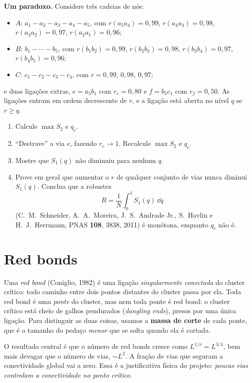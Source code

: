 \documentclass[11pt]{article}
\begin{document}
 \textbf{Um paradoxo.} Considere três cadeias de nós:
\begin{itemize}
  \item $A$: $a_1-a_2-a_3-a_4-a_5$, com $r(a_5a_4)=0{,}99$, $r(a_4a_3)=0{,}98$, $r(a_3a_2)=0{,}97$, $r(a_2a_1)=0{,}96$;
  \item $B$: $b_1-\cdots-b_5$, com $r(b_1b_2)=0{,}99$, $r(b_2b_3)=0{,}98$, $r(b_3b_4)=0{,}97$, $r(b_4b_5)=0{,}96$;
  \item $C$: $c_1-c_2-c_3-c_4$, com $r = 0{,}99$, $0{,}98$, $0{,}97$;
\end{itemize}
e duas ligações extras, $e = a_5b_1$ com $r_e = 0{,}80$ e $f = b_5c_1$ com $r_f = 0{,}50$. As ligações entram em ordem decrescente de $r$, e a ligação está aberta no nível $q$ se $r\ge q$.
\begin{enumerate}
  \item Calcule $\max S_2$ e $q_c$.
  \item ``Destrave'' a via $e$, fazendo $r_e\to 1$. Recalcule $\max S_2$ e $q_c$.
  \item Mostre que $S_1(q)$ não diminuiu para nenhum $q$.
  \item Prove em geral que aumentar o $r$ de qualquer conjunto de vias nunca diminui $S_1(q)$. Conclua que a robustez
  \[ R = \frac1N\int_0^1 S_1(q)\,\dd q \]
  (C.~M.~Schneider, A.~A.~Moreira, J.~S.~Andrade Jr., S.~Havlin e H.~J.~Herrmann, PNAS \textbf{108}, 3838, 2011) é monótona, enquanto $q_c$ não é.
\end{enumerate}

\section{Red bonds}

\begin{ideia}
Uma \emph{red bond} (Coniglio, 1982) é uma ligação \emph{singularmente conectada} do cluster crítico: todo caminho entre dois pontos distantes do cluster passa por ela. Toda red bond é uma \emph{ponte} do cluster, mas nem toda ponte é red bond: o cluster crítico está cheio de galhos pendurados (\emph{dangling ends}), presos por uma única ligação. Para distinguir as duas coisas, usamos a \textbf{massa de corte} de cada ponte, que é o tamanho do pedaço \emph{menor} que se solta quando ela é cortada.
\end{ideia}

O resultado central é que o número de red bonds cresce como $L^{1/\nu} = L^{3/4}$, bem mais devagar que o número de vias, $\sim L^2$. A fração de vias que seguram a conectividade global vai a zero. Essa é a justificativa física do projeto: \emph{poucas vias controlam a conectividade no ponto crítico}.
\end{document}
